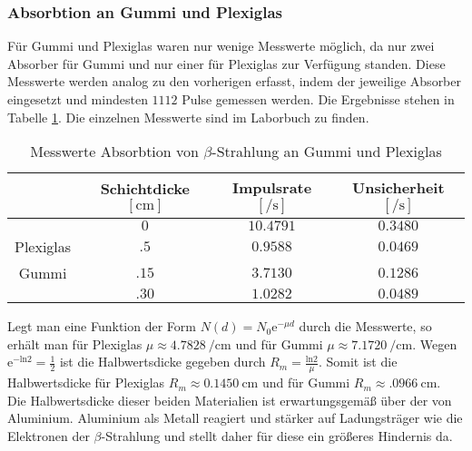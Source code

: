 \subsubsection{Absorbtion an Gummi und Plexiglas}
Für Gummi und Plexiglas waren nur wenige Messwerte möglich, da nur zwei Absorber für Gummi und nur einer für Plexiglas zur Verfügung standen. Diese Messwerte werden analog zu den vorherigen erfasst, indem der jeweilige Absorber eingesetzt und mindesten $ 1112 $ Pulse gemessen werden.
Die Ergebnisse stehen in Tabelle \ref{tab:abs_gum}. Die einzelnen Messwerte sind im Laborbuch zu finden.\\
\begin{table}[h!]
\centering
\begin{tabular}{c|c|c|c}
& Schichtdicke $ [\si{\centi\meter}] $ & Impulsrate $ [\si{\per\second}] $ & Unsicherheit $ [\si{\per\second}] $ \\\hline
& $ 0 $ & $ \num{10.4791} $ & $ \num{0.3480} $ \\ 
Plexiglas &  $ \num{.5} $ & $ \num{0.9588} $ & $ \num{0.0469} $ \\
Gummi & $ \num{.15} $ & $ \num{3.7130} $ & $ \num{0.1286} $ \\
	  &	$ \num{.30} $ & $ \num{1.0282} $ & $ \num{0.0489} $
\end{tabular}
\caption{Messwerte Absorbtion von $ \beta $-Strahlung an Gummi und Plexiglas}
\label{tab:abs_gum}
\end{table}
Legt man eine Funktion der Form $ N(d) = N_0 \mathrm{e}^{-\mu d} $ durch die Messwerte, so erhält man für Plexiglas $ \mu \approx \SI{4.7828}{\per\centi\meter} $ und für Gummi $ \mu \approx \SI{7.1720}{\per\centi\meter} $. Wegen $ \mathrm{e}^{-\mathrm{ln} 2} = \frac{1}{2} $ ist die Halbwertsdicke gegeben durch $ R_m = \frac{\mathrm{ln}2}{\mu} $. Somit ist die Halbwertsdicke für Plexiglas $ R_m \approx \SI{0.1450}{\centi\meter} $ und für Gummi $ R_m \approx \SI{.0966}{\centi\meter} $.\\
Die Halbwertsdicke dieser beiden Materialien ist erwartungsgemäß über der von Aluminium. Aluminium als Metall reagiert und stärker auf Ladungsträger wie die Elektronen der $ \beta $-Strahlung und stellt daher für diese ein größeres Hindernis da.

